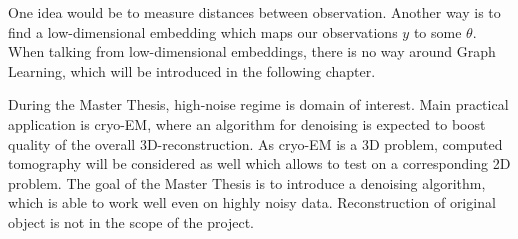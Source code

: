 One idea would be to measure distances between observation.
Another way is to find a low-dimensional embedding which maps our observations $y$ to some $\theta$.
When talking from low-dimensional embeddings, there is no way around Graph Learning, which will be introduced
in the following chapter.

\begin{tcolorbox}[colback=red!5!white,colframe=red!75!black]
    During the Master Thesis, high-noise regime is domain of interest.
    Main practical application is cryo-EM, where an algorithm for denoising is expected to boost
    quality of the overall 3D-reconstruction. As cryo-EM is a 3D problem, computed tomography will
    be considered as well which allows to test on a corresponding 2D problem.
    The goal of the Master Thesis is to introduce a denoising algorithm, which is able to work well even 
    on highly noisy data. Reconstruction of original object is not in the scope of the project.
\end{tcolorbox}
